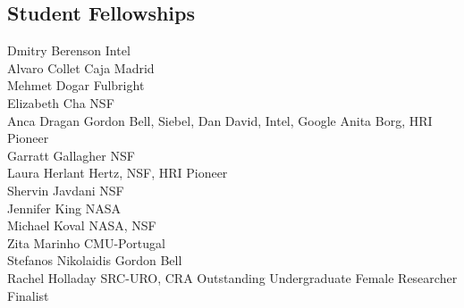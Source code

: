 \documentclass[10pt]{article}
\begin{document}
\subsection{Student Fellowships}
\noindent
Dmitry Berenson \hfill Intel\\
Alvaro Collet \hfill Caja Madrid\\
Mehmet Dogar \hfill Fulbright\\
Elizabeth Cha \hfill NSF\\
Anca Dragan \hfill Gordon Bell, Siebel, Dan David, Intel, Google Anita Borg, HRI Pioneer\\
Garratt Gallagher \hfill NSF\\
Laura Herlant \hfill Hertz, NSF, HRI Pioneer\\
Shervin Javdani \hfill NSF\\
Jennifer King \hfill NASA\\
Michael Koval \hfill NASA, NSF\\
Zita Marinho \hfill CMU-Portugal\\
Stefanos Nikolaidis \hfill Gordon Bell\\
Rachel Holladay \hfill SRC-URO, CRA Outstanding Undergraduate Female Researcher Finalist\\
\end{document}
